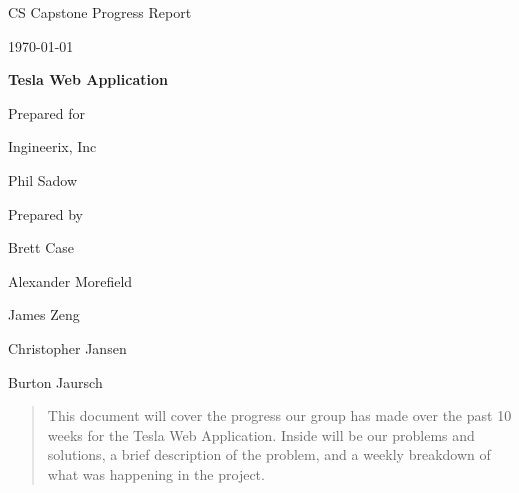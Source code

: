 \documentclass[onecolumn, draftclsnofoot,10pt, compsoc]{IEEEtran}
\def \CapstoneTeamName{                 The Ingineers}
\def \CapstoneTeamNumber{               22}
\def \GroupMemberOne{                   Brett Case}
\def \GroupMemberTwo{                   Alexander Morefield}
\def \GroupMemberThree{                 James Zeng}
\def \GroupMemberFour{                  Christopher Jansen}
\def \GroupMemberFive{                  Burton Jaursch}
\def \CapstoneProjectName{              Tesla Web Application}
\def \CapstoneSponsorCompany{           Ingineerix, Inc}
\def \CapstoneSponsorPerson{            Phil Sadow}
\def \DocType{                  %
                                Progress Report
                                }
\newcommand{\NameSigPair}[1]{\par
\makebox[2.75in][r]{#1} \hfil   \makebox[3.25in]{\makebox[2.25in]{\hrulefill} \hfill            \makebox[.75in]{\hrulefill}}
\par\vspace{-12pt} \textit{\tiny\noindent
\makebox[2.75in]{} \hfil                \makebox[3.25in]{\makebox[2.25in][r]{Signature} \hfill  \makebox[.75in][r]{Date}}}}
\renewcommand{\NameSigPair}[1]{#1}
\begin{document}
\begin{titlepage}
    \begin{singlespace}
        \hfill
        \par\vspace{.2in}
        \centering
        \scshape{
            \huge CS Capstone \DocType \par
            {\large\today}\par
            \vspace{.5in}
            \textbf{\Huge\CapstoneProjectName}\par
            \vfill

            \vfill
            {\large Prepared for}\par
            \Huge \CapstoneSponsorCompany\par
            \vspace{5pt}
            {\Large\NameSigPair{\CapstoneSponsorPerson}\par}
            {\large Prepared by }\par
            \vspace{5pt}
            {\Large
                \NameSigPair{\GroupMemberOne}\par
                \NameSigPair{\GroupMemberTwo}\par
                \NameSigPair{\GroupMemberThree}\par
                \NameSigPair{\GroupMemberFour}\par
                \NameSigPair{\GroupMemberFive}\par
            }
            \vspace{20pt}
        }
        \begin{abstract}
        This document will cover the progress our group has made over the past 10 weeks for the Tesla Web Application. Inside will be our problems and solutions, a brief description of the problem, and a weekly breakdown of what was happening in the project.
        \end{abstract}
    \end{singlespace}
\end{titlepage}
\tableofcontents
\clearpage
\end{document}
